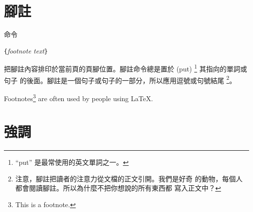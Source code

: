 \section{腳註}
命令
\begin{lscommand}
\verb|{|\emph{footnote text}\verb|}|
\end{lscommand}
\noindent 把腳註內容排印於當前頁的頁腳位置。腳註命令總是置於 (put)
\footnote{``put'' 是最常使用的英文單詞之一。} 其指向的單詞或句子
的後面。腳註是一個句子或句子的一部分，所以應用逗號或句號結尾
\footnote{注意，腳註把讀者的注意力從文檔的正文引開。我們是好奇
的動物，每個人都會閱讀腳註。所以為什麼不把你想說的所有東西都
寫入正文中？\footnotemark}。 


\begin{example}
Footnotes\footnote{This is
  a footnote.} are often used
by people using \LaTeX.
\end{example}
%
\section{強調}

